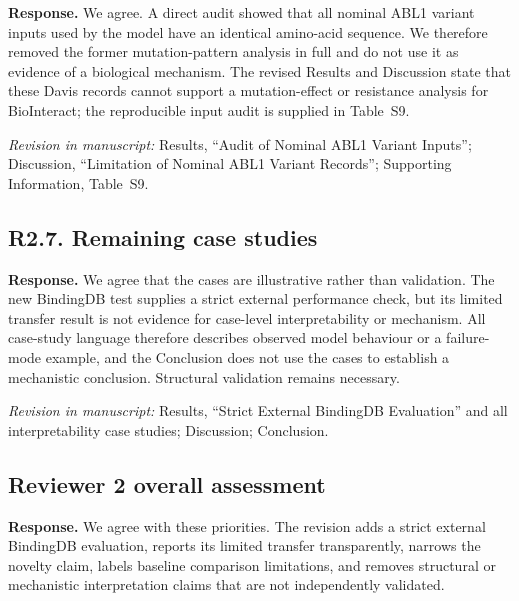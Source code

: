 \documentclass[11pt,a4paper]{article}
\newcommand{\response}{\noindent\textbf{Response.} }
\newcommand{\change}[1]{\par\smallskip\noindent\textit{Revision in manuscript:} #1\par\medskip}
\begin{document}
\response We agree. A direct audit showed that all nominal ABL1 variant inputs
used by the model have an identical amino-acid sequence. We therefore removed
the former mutation-pattern analysis in full and do not use it as evidence of a
biological mechanism. The revised Results and Discussion state that these Davis
records cannot support a mutation-effect or resistance analysis for BioInteract;
the reproducible input audit is supplied in Table~S9.

\change{Results, ``Audit of Nominal ABL1 Variant Inputs''; Discussion,
``Limitation of Nominal ABL1 Variant Records''; Supporting Information,
Table~S9.}

\subsection*{R2.7. Remaining case studies}


\response We agree that the cases are illustrative rather than validation. The
new BindingDB test supplies a strict external performance check, but its limited
transfer result is not evidence for case-level interpretability or mechanism.
All case-study language therefore describes observed model behaviour or a
failure-mode example, and the Conclusion does not use the cases to establish a
mechanistic conclusion. Structural validation remains necessary.

\change{Results, ``Strict External BindingDB Evaluation'' and all interpretability
case studies; Discussion; Conclusion.}

\subsection*{Reviewer 2 overall assessment}


\response We agree with these priorities. The revision adds a strict external
BindingDB evaluation, reports its limited transfer transparently, narrows the
novelty claim, labels baseline comparison limitations, and removes structural or
mechanistic interpretation claims that are not independently validated.
\end{document}
